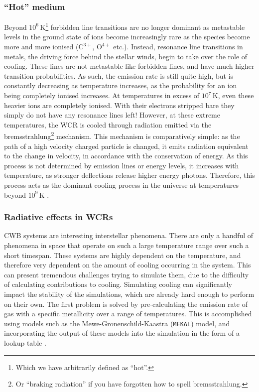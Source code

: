 \subsubsection{``Hot'' medium}

Beyond $10^6\,\si{\kelvin}$\footnote{Which we have arbitrarily defined as ``hot''.} forbidden line transitions are no longer dominant as metastable levels in the ground state of ions become increasingly rare as the species become more and more ionised ($\text{C}^{3+}$, $\text{O}^{4+}$ etc.).
Instead, resonance line transitions in metals, the driving force behind the stellar winds, begin to take over the role of cooling.
These lines are not metastable like forbidden lines, and have much higher transition probabilities.
As such, the emission rate is still quite high, but is constantly decreasing as temperature increases, as the probability for an ion being completely ionised increases.
At temperatures in excess of $10^7\,\si{\kelvin}$, even these heavier ions are completely ionised.
With their electrons stripped bare they simply do not have any resonance lines left!
However, at these extreme temperatures, the WCR is cooled through radiation emitted via the bremsstrahlung\footnote{Or ``braking radiation'' if you have forgotten how to spell bremsstrahlung.} mechanism.
This mechanism is comparatively simple: as the path of a high velocity charged particle is changed, it emits radiation equivalent to the change in velocity, in accordance with the conservation of energy.
As this process is not determined by emission lines or energy levels, it increases with temperature, as stronger deflections release higher energy photons.
Therefore, this process acts as the dominant cooling process in the universe at temperatures beyond $10^9 \, \si{\kelvin}$
\parencite[Ch.~6]{longairHighEnergyAstrophysics2011}.

\subsubsection{Radiative effects in WCRs}

CWB systems are interesting interstellar phenomena.
There are only a handful of phenomena in space that operate on such a large temperature range over such a short timespan.
These systems are highly dependent on the temperature, and therefore very dependent on the amount of cooling occurring in the system.
This can present tremendous challenges trying to simulate them, due to the difficulty of calculating contributions to cooling.
Simulating cooling can significantly impact the stability of the simulations, which are already hard enough to perform on their own.
The first problem is solved by pre-calculating the emission rate of gas with a specific metallicity over a range of temperatures.
This is accomplished using models such as the Mewe-Gronenschild-Kaastra (\texttt{MEKAL}) model, and incorporating the output of these models into the simulation in the form of a lookup table
\parencite{meweCalculatedXradiationOptically1985,kaastraSPEXHighresolutionCosmic2013}.

